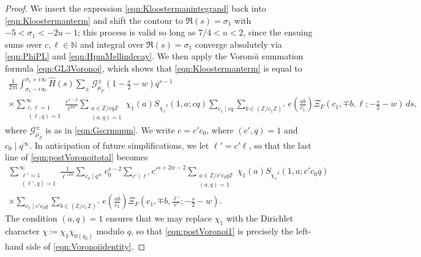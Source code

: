 \documentclass[11pt,a4paper]{amsart}
\newcommand{\Gscr}{\mathscr{G}}
\newcommand{\N}{\mathbb{N}}
\newcommand{\Z}{\mathbb{Z}}
\numberwithin{equation}{section}
\theoremstyle{remark}
\theoremstyle{definition}
\begin{document}
\begin{proof}
We insert the expression \eqref{eqn:Kloostermanintegrand} back into \eqref{eqn:Kloostermanterm} and shift the contour to $\Re(s) = \sigma_1$ with $-5 < \sigma_1 < -2u - 1$; this process is valid so long as $7/4 < u < 2$, since the ensuing sums over $c,\ell \in \N$ and integral over $\Re(s) = \sigma_1$ converge absolutely via \eqref{eqn:PhiPL} and \eqref{eqn:HpmMellindecay}. We then apply the Vorono\u{\i} summation formula \eqref{eqn:GL3Voronoi}, which shows that \eqref{eqn:Kloostermanterm} is equal to
\begin{multline}
\label{eqn:postVoronoitotal}
\frac{1}{2\pi i} \int_{\sigma_1 - i\infty}^{\sigma_1 + i\infty} \widehat{H}(s) \sum_{\pm} \Gscr_{\mu_F}^{\pm}\left(1 - \frac{s}{2} - w\right) q^{s - 1}	\\
\times \sum_{\substack{c,\ell = 1 \\ (\ell,q) = 1}}^{\infty} \frac{c^{s - 2}}{\ell^{2w}} \sum_{\substack{a \in \Z/cq\Z \\ (a,q) = 1}} \chi_1(a) S_{\overline{\chi_1}^2}(1,a;cq) \sum_{c_1 \mid cq} \sum_{b \in (\Z/c_1\Z)^{\times}} e\left(\frac{a\overline{b}}{c_1}\right) \Xi_F\left(c_1,\mp b,\ell;-\frac{s}{2} - w\right) \, ds,
\end{multline}
where $\Gscr_{\mu_F}^{\pm}$ is as in \eqref{eqn:Gscrmupm}. We write $c = c' c_0$, where $(c',q) = 1$ and $c_0 \mid q^{\infty}$. In anticipation of future simplifications, we let $\ell' = c' \ell$, so that the last line of \eqref{eqn:postVoronoitotal} becomes
\begin{multline}
\label{eqn:postVoronoi1}
\sum_{\substack{\ell' = 1 \\ (\ell',q) = 1}}^{\infty} \frac{1}{{\ell'}^{2w}} \sum_{c_0 \mid q^{\infty}} c_0^{s - 2} \sum_{c' \mid \ell'} {c'}^{s + 2w - 2} \sum_{\substack{a \in \Z/c' c_0 q\Z \\ (a,q) = 1}} \chi_1(a) S_{\overline{\chi_1}^2}(1,a;c' c_0 q)	\\
\times \sum_{c_1 \mid c' c_0 q} \sum_{b \in (\Z/c_1\Z)^{\times}} e\left(\frac{a\overline{b}}{c_1}\right) \Xi_F\left(c_1,\mp b,\frac{\ell'}{c'};-\frac{s}{2} - w\right).
\end{multline}
The condition $(a,q) = 1$ ensures that we may replace $\chi_1$ with the Dirichlet character $\chi \coloneqq \chi_1 \chi_{0(q_2)}$ modulo $q$, so that \eqref{eqn:postVoronoi1} is precisely the left-hand side of \eqref{eqn:Voronoiidentity}.


\end{proof}
\end{document}
